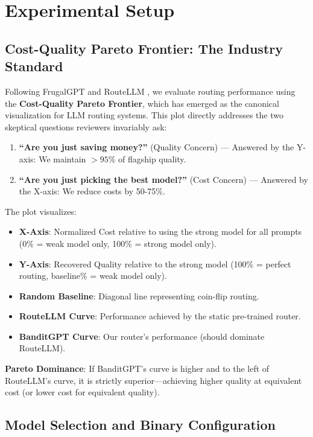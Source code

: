 \section{Experimental Setup}

\subsection{Cost-Quality Pareto Frontier: The Industry Standard}

Following FrugalGPT \cite{chen2023frugalgpt} and RouteLLM \cite{ong2024routellm}, we evaluate routing performance using the \textbf{Cost-Quality Pareto Frontier}, which has emerged as the canonical visualization for LLM routing systems. This plot directly addresses the two skeptical questions reviewers invariably ask:

\begin{enumerate}
    \item \textbf{``Are you just saving money?''} (Quality Concern) --- Answered by the Y-axis: We maintain $>95\%$ of flagship quality.
    \item \textbf{``Are you just picking the best model?''} (Cost Concern) --- Answered by the X-axis: We reduce costs by 50-75\%.
\end{enumerate}

\noindent The plot visualizes:
\begin{itemize}
    \item \textbf{X-Axis}: Normalized Cost relative to using the strong model for all prompts (0\% = weak model only, 100\% = strong model only).
    \item \textbf{Y-Axis}: Recovered Quality relative to the strong model (100\% = perfect routing, baseline\% = weak model only).
    \item \textbf{Random Baseline}: Diagonal line representing coin-flip routing.
    \item \textbf{RouteLLM Curve}: Performance achieved by the static pre-trained router.
    \item \textbf{BanditGPT Curve}: Our router's performance (should dominate RouteLLM).
\end{itemize}

\noindent \textbf{Pareto Dominance}: If BanditGPT's curve is higher and to the left of RouteLLM's curve, it is strictly superior---achieving higher quality at equivalent cost (or lower cost for equivalent quality).

\subsection{Model Selection and Binary Configuration}

